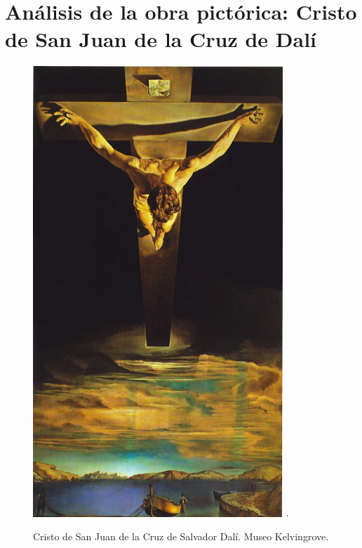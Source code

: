 \section{Análisis de la obra pictórica: Cristo de San Juan de la Cruz de Dalí}

\begin{figure}[ht!]
    \centering
    \includegraphics[width=0.84\textwidth]{dali.jpg}
   .\caption{Cristo de San Juan de la Cruz de Salvador Dalí. Museo Kelvingrove.} %
\end{figure}

\newpage


